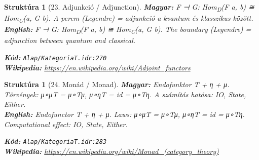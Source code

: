 \documentclass[11pt,a4paper,twocolumn]{article}
\newtheorem{struktura}[tetel]{Struktúra}
\begin{document}
\begin{struktura}[23. Adjunkció / Adjunction]

\textbf{Magyar:} F ⊣ G: Hom\textsubscript{D}(F a, b) ≅ Hom\textsubscript{C}(a, G b). A perem (Legendre) = adjunkció a kvantum és klasszikus között.\\

\textbf{English:} F ⊣ G: Hom\textsubscript{D}(F a, b) ≅ Hom\textsubscript{C}(a, G b). The boundary (Legendre) = adjunction between quantum and classical.\\

\begin{center}
\end{center}

\textbf{Kód:} \texttt{Alap/KategoriaT.idr:270}\\
\textbf{Wikipedia:} \url{https://en.wikipedia.org/wiki/Adjoint_functors}

\end{struktura}

\vspace{0.5cm}

\begin{struktura}[24. Monád / Monad]

\textbf{Magyar:} Endofunktor T + η + μ. Törvények: μ∘μT = μ∘Tμ, μ∘ηT = id = μ∘Tη. A számítás hatása: IO, State, Either.\\

\textbf{English:} Endofunctor T + η + μ. Laws: μ∘μT = μ∘Tμ, μ∘ηT = id = μ∘Tη. Computational effect: IO, State, Either.\\

\begin{center}
\end{center}

\textbf{Kód:} \texttt{Alap/KategoriaT.idr:283}\\
\textbf{Wikipedia:} \url{https://en.wikipedia.org/wiki/Monad_(category_theory)}

\end{struktura}

\vspace{0.5cm}
\end{document}

